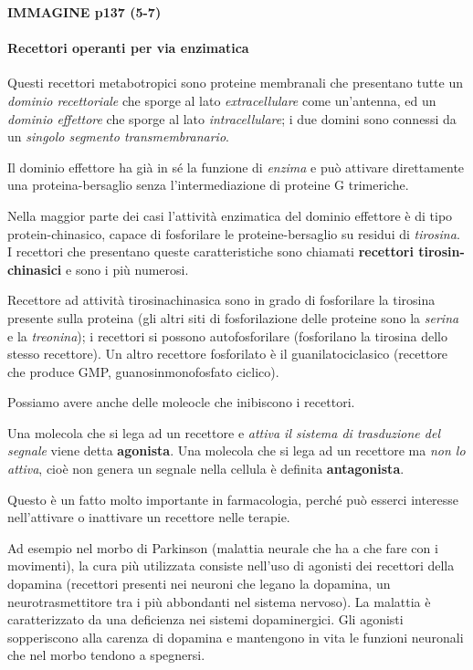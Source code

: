 \documentclass[]{article}
\begin{document}
\textbf{IMMAGINE p137 (5-7)}

\paragraph{Recettori operanti per via
enzimatica}\label{recettori-operanti-per-via-enzimatica}

Questi recettori metabotropici sono proteine membranali che presentano
tutte un \emph{dominio recettoriale} che sporge al lato
\emph{extracellulare} come un'antenna, ed un \emph{dominio effettore}
che sporge al lato \emph{intracellulare}; i due domini sono connessi da
un \emph{singolo segmento transmembranario}.

Il dominio effettore ha già in sé la funzione di \emph{enzima} e può
attivare direttamente una proteina-bersaglio senza l'intermediazione di
proteine G trimeriche.

Nella maggior parte dei casi l'attività enzimatica del dominio effettore
è di tipo protein-chinasico, capace di fosforilare le proteine-bersaglio
su residui di \emph{tirosina}. I recettori che presentano queste
caratteristiche sono chiamati \textbf{recettori tirosin-chinasici} e
sono i più numerosi.

Recettore ad attività tirosinachinasica sono in grado di fosforilare la
tirosina presente sulla proteina (gli altri siti di fosforilazione delle
proteine sono la \emph{serina} e la \emph{treonina}); i recettori si
possono autofosforilare (fosforilano la tirosina dello stesso
recettore). Un altro recettore fosforilato è il guanilatociclasico
(recettore che produce GMP, guanosinmonofosfato ciclico).

Possiamo avere anche delle moleocle che inibiscono i recettori.

Una molecola che si lega ad un recettore e \emph{attiva il sistema di
trasduzione del segnale} viene detta \textbf{agonista}. Una molecola che
si lega ad un recettore ma \emph{non lo attiva}, cioè non genera un
segnale nella cellula è definita \textbf{antagonista}.

Questo è un fatto molto importante in farmacologia, perché può esserci
interesse nell'attivare o inattivare un recettore nelle terapie.

Ad esempio nel morbo di Parkinson (malattia neurale che ha a che fare
con i movimenti), la cura più utilizzata consiste nell'uso di agonisti
dei recettori della dopamina (recettori presenti nei neuroni che legano
la dopamina, un neurotrasmettitore tra i più abbondanti nel sistema
nervoso). La malattia è caratterizzato da una deficienza nei sistemi
dopaminergici. Gli agonisti sopperiscono alla carenza di dopamina e
mantengono in vita le funzioni neuronali che nel morbo tendono a
spegnersi.
\end{document}
